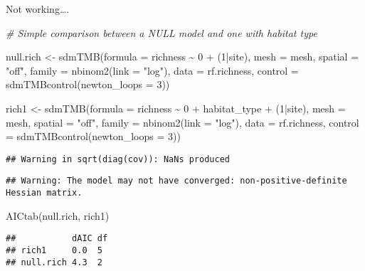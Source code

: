 \documentclass[
]{article}
\newenvironment{Shaded}{\begin{snugshade}}{\end{snugshade}}
\newcommand{\AttributeTok}[1]{\textcolor[rgb]{0.77,0.63,0.00}{#1}}
\newcommand{\CommentTok}[1]{\textcolor[rgb]{0.56,0.35,0.01}{\textit{#1}}}
\newcommand{\DecValTok}[1]{\textcolor[rgb]{0.00,0.00,0.81}{#1}}
\newcommand{\FunctionTok}[1]{\textcolor[rgb]{0.00,0.00,0.00}{#1}}
\newcommand{\NormalTok}[1]{#1}
\newcommand{\OtherTok}[1]{\textcolor[rgb]{0.56,0.35,0.01}{#1}}
\newcommand{\SpecialCharTok}[1]{\textcolor[rgb]{0.00,0.00,0.00}{#1}}
\newcommand{\StringTok}[1]{\textcolor[rgb]{0.31,0.60,0.02}{#1}}
\begin{document}
Not working\ldots.

\begin{Shaded}
\begin{Highlighting}[]
\CommentTok{\# Simple comparison between a NULL model and one with habitat type}

\NormalTok{null.rich }\OtherTok{\textless{}{-}} \FunctionTok{sdmTMB}\NormalTok{(}\AttributeTok{formula =}\NormalTok{ richness }\SpecialCharTok{\textasciitilde{}} \DecValTok{0} \SpecialCharTok{+}\NormalTok{ (}\DecValTok{1}\SpecialCharTok{|}\NormalTok{site), }\AttributeTok{mesh =}\NormalTok{ mesh, }\AttributeTok{spatial =} \StringTok{"off"}\NormalTok{, }\AttributeTok{family =} \FunctionTok{nbinom2}\NormalTok{(}\AttributeTok{link =} \StringTok{"log"}\NormalTok{), }
            \AttributeTok{data =}\NormalTok{ rf.richness, }\AttributeTok{control =} \FunctionTok{sdmTMBcontrol}\NormalTok{(}\AttributeTok{newton\_loops =} \DecValTok{3}\NormalTok{))}

\NormalTok{rich1 }\OtherTok{\textless{}{-}} \FunctionTok{sdmTMB}\NormalTok{(}\AttributeTok{formula =}\NormalTok{ richness }\SpecialCharTok{\textasciitilde{}} \DecValTok{0} \SpecialCharTok{+}\NormalTok{ habitat\_type }\SpecialCharTok{+}\NormalTok{ (}\DecValTok{1}\SpecialCharTok{|}\NormalTok{site), }\AttributeTok{mesh =}\NormalTok{ mesh, }\AttributeTok{spatial =} \StringTok{"off"}\NormalTok{, }\AttributeTok{family =} \FunctionTok{nbinom2}\NormalTok{(}\AttributeTok{link =} \StringTok{"log"}\NormalTok{), }
                \AttributeTok{data =}\NormalTok{ rf.richness, }\AttributeTok{control =} \FunctionTok{sdmTMBcontrol}\NormalTok{(}\AttributeTok{newton\_loops =} \DecValTok{3}\NormalTok{))}
\end{Highlighting}
\end{Shaded}

\begin{verbatim}
## Warning in sqrt(diag(cov)): NaNs produced
\end{verbatim}

\begin{verbatim}
## Warning: The model may not have converged: non-positive-definite Hessian matrix.
\end{verbatim}

\begin{Shaded}
\begin{Highlighting}[]
\FunctionTok{AICtab}\NormalTok{(null.rich, rich1)}
\end{Highlighting}
\end{Shaded}

\begin{verbatim}
##           dAIC df
## rich1     0.0  5 
## null.rich 4.3  2
\end{verbatim}
\end{document}
